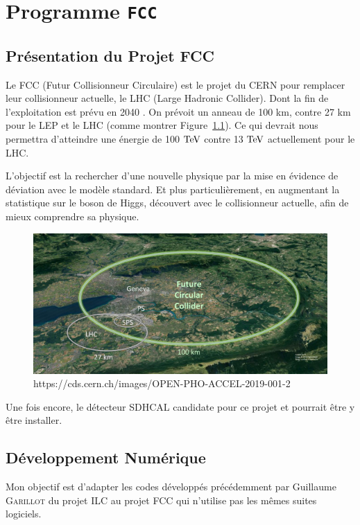 \chapter{Programme \texttt{FCC}}

\section{Présentation du Projet FCC}

Le FCC (Futur Collisionneur Circulaire) est le projet du CERN pour remplacer 
leur collisionneur actuelle, le LHC (Large Hadronic Collider). 
Dont la fin de l'exploitation est prévu en 2040 \cite{cern:fcc}.
On prévoit un anneau de 100 km, contre 27 km pour le LEP et le LHC 
(comme montrer Figure~\ref{fcc:img}).
Ce qui devrait nous permettra d'atteindre une énergie de 100 $\mathrm{TeV}$ contre 13 $\mathrm{TeV}$
actuellement pour le LHC.

L'objectif est la rechercher d'une nouvelle physique par la mise en évidence de déviation avec le modèle standard. Et plus particulièrement, en augmentant la statistique sur le boson de Higgs, découvert avec le collisionneur actuelle, afin de mieux comprendre sa physique.

\begin{figure}[!ht]
    \centering
    \includegraphics[width=\textwidth]{../img/FCC.jpg}
    \caption{https://cds.cern.ch/images/OPEN-PHO-ACCEL-2019-001-2}
    \label{fcc:img}
\end{figure}

Une fois encore, le détecteur SDHCAL candidate pour ce projet et pourrait être y être installer.

\section{Développement Numérique}

Mon objectif est d'adapter les codes développés précédemment par Guillaume 
\textsc{Garillot} du projet ILC au projet FCC qui n'utilise pas les mêmes suites logiciels.\\


